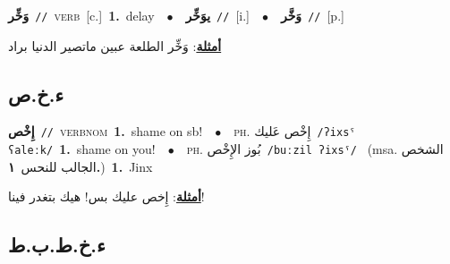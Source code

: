\documentclass[10pt,a4paper,twoside]{article} %
\begin{document}
\begin{multicols}{2}
{{{{{{{{{\setlength\topsep{0pt}\textbf{\foreignlanguage{arabic}{وَخِّر}}\ {\color{gray}\texttt{//}\color{black}}\ \textsc{verb}\ [c.]\ \textbf{1.}~delay\ \ $\bullet$\ \ \setlength\topsep{0pt}\textbf{\foreignlanguage{arabic}{يوَخِّر}}\ {\color{gray}\texttt{//}\color{black}}\ [i.]\ \ $\bullet$\ \ \setlength\topsep{0pt}\textbf{\foreignlanguage{arabic}{وَخَّر}}\ {\color{gray}\texttt{//}\color{black}}\ [p.]\  \begin{flushright}\color{gray}\foreignlanguage{arabic}{\textbf{\underline{\foreignlanguage{arabic}{أمثلة}}}: وَخِّر الطلعة عبين ماتصير الدنيا براد}\end{flushright}\color{black}} \vspace{2mm}

\vspace{-3mm}
\subsection*{\color{blue}\foreignlanguage{arabic}{ء.خ.ص}\color{blue}{ (ntws)}} 

{\setlength\topsep{0pt}\textbf{\foreignlanguage{arabic}{إِخْص}}\ {\color{gray}\texttt{//}\color{black}}\ \textsc{verb\textunderscore nom}\ \textbf{1.}~shame on sb!\ \ $\bullet$\ \ \textsc{ph.} \color{gray} \foreignlanguage{arabic}{إِخْص عَليك}\color{black}\ {\color{gray}\texttt{/{\sffamily ʔixsˤ ʕaleːk}/}\color{black}}\ \textbf{1.}~shame on you!\ \ $\bullet$\ \ \textsc{ph.} \color{gray} \foreignlanguage{arabic}{بُوز الإِخْص}\color{black}\ {\color{gray}\texttt{/{\sffamily buːzil ʔixsˤ}/}\color{black}}\ \color{gray} (msa. \foreignlanguage{arabic}{الشخص الجالب للنحس}~\foreignlanguage{arabic}{\textbf{١.}})\color{black}\ \textbf{1.}~Jinx\  \begin{flushright}\color{gray}\foreignlanguage{arabic}{\textbf{\underline{\foreignlanguage{arabic}{أمثلة}}}: إِخص عليك بس! هيك بتغدر فينا!}\end{flushright}\color{black}} \vspace{2mm}

\vspace{-3mm}
\subsection*{\color{blue}\foreignlanguage{arabic}{ء.خ.ط.ب.ط}\color{blue}{ (ntws)}} 

}}}}}}}}
\end{multicols}
\end{document}
